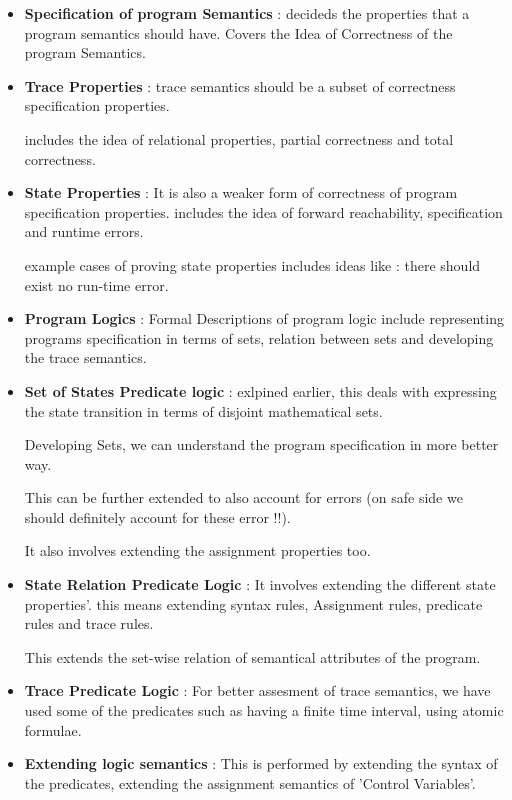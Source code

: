 \begin{itemize}
	\item{\textbf{Specification of program Semantics} : decideds the properties that a program semantics should have. Covers the Idea of Correctness of the program Semantics.
	}
	
	\item{\textbf{Trace Properties} : trace semantics should be a subset of correctness specification properties. 

	includes the idea of relational properties, partial correctness and total correctness.
	}
	
	\item{\textbf{State Properties} : It is also a weaker form of correctness of program specification properties. includes the idea of forward reachability, specification and runtime errors.

	example cases of proving state properties includes ideas like : there should exist no run-time error. 
	}
	
	\item{\textbf{Program Logics} : Formal Descriptions of program logic include representing programs specification in terms of sets, relation between sets and developing the trace semantics.
	}
	
	\item{\textbf{Set of States Predicate logic} : exlpined earlier, this deals with expressing the state transition in terms of disjoint mathematical sets.

	Developing Sets, we can understand the program specification in more better way.

	This can be further extended to also account for errors (on safe side we should definitely account for these error !!).

	It also involves extending the assignment properties too. 
	}
	
	\item{\textbf{State Relation Predicate Logic} : It involves extending the different state properties'. this means extending syntax rules, Assignment rules, predicate rules and trace rules.

	This extends the set-wise relation of semantical attributes of the program.
	}
	
	\item{\textbf{Trace Predicate Logic} : For  better assesment of trace semantics, we have used some of the predicates such as having a finite time interval, using atomic formulae.
	}
	
	\item{\textbf{Extending logic semantics} : This is performed by extending the syntax of the predicates, extending the assignment semantics of 'Control Variables'.
	}
	

\end{itemize}
